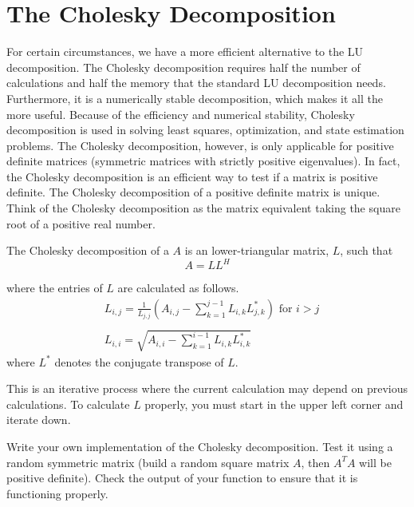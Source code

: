 \section*{The Cholesky Decomposition}

For certain circumstances, we have a more efficient alternative to the LU decomposition.  The Cholesky decomposition requires half the number of calculations and half the memory that the standard LU decomposition needs.  Furthermore, it is a numerically stable decomposition, which makes it all the more useful.  Because of the efficiency and numerical stability, Cholesky decomposition is used in solving least squares, optimization, and state estimation problems.  The Cholesky decomposition, however, is only applicable for positive definite matrices (symmetric matrices with strictly positive eigenvalues).  In fact, the Cholesky decomposition is an efficient way to test if a matrix is positive definite.  The Cholesky decomposition of a positive definite matrix is unique.  Think of the Cholesky decomposition as the matrix equivalent taking the square root of a positive real number.

The Cholesky decomposition of a $A$ is an lower-triangular matrix, $L$, such that
\begin{equation*}
 A = LL^H
\end{equation*}

where the entries of $L$ are calculated as follows.
\begin{align*}
&L_{i,j} = \frac{1}{L_{j,j}}\left(A_{i,j} -\sum_{k=1}^{j-1}{L_{i,k}L_{j,k}^*}\right) \mbox{ for $i>j$} \\ \\
&L_{i,i} = \sqrt{A_{i,i} - \sum_{k=1}^{i-1}{L_{i,k}L_{i,k}^*}}
\end{align*}
where $L^*$ denotes the conjugate transpose of $L$.

This is an iterative process where the current calculation may depend on previous calculations.  To calculate $L$ properly, you must start in the upper left corner and iterate down.


\begin{problem}
Write your own implementation of the Cholesky decomposition. Test it using a random symmetric matrix (build a random square matrix $A$, then $A^TA$ will be positive definite). Check the output of your function to ensure that it is functioning properly.
\end{problem}

